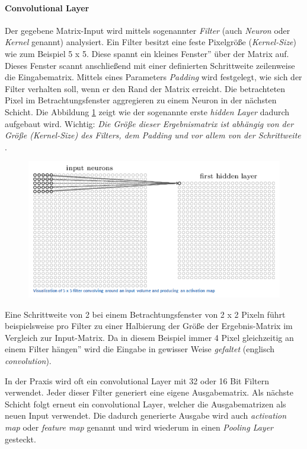 \paragraph{Convolutional Layer}
Der gegebene Matrix-Input wird mittels sogenannter \emph{Filter} (auch \emph{Neuron} oder \emph{Kernel} genannt) analysiert. Ein Filter besitzt eine feste Pixelgröße (\emph{Kernel-Size}) wie zum Beispiel 5 x 5. Diese spannt ein kleines \glqq Fenster'' über der Matrix auf. Dieses Fenster scannt anschließend mit einer definierten Schrittweite zeilenweise die Eingabematrix. Mittels eines Parameters \emph{Padding} wird festgelegt, wie sich der Filter verhalten soll, wenn er den Rand der Matrix erreicht. Die betrachteten Pixel im Betrachtungsfenster aggregieren zu einem Neuron in der nächsten Schicht. Die Abbildung \ref{fig:cnn_convLayer} zeigt wie der sogenannte erste \emph{hidden Layer} dadurch aufgebaut wird. Wichtig: \emph{Die Größe dieser Ergebnismatrix ist abhängig von der Größe (Kernel-Size) des Filters, dem Padding und vor allem von der Schrittweite} \cite{cnnFunktionsweise2}. 

\begin{figure}[!htb]
	\centering
	\includegraphics[width=.6\linewidth]{img/cnn_convLayer}
	\label{fig:cnn_convLayer}
\end{figure}

Eine Schrittweite von 2 bei einem Betrachtungsfenster von 2 x 2 Pixeln führt beispielsweise pro Filter zu einer Halbierung der Größe der Ergebnis-Matrix im Vergleich zur Input-Matrix. Da in diesem Beispiel immer 4 Pixel gleichzeitig an einem Filter \glqq hängen'' wird die Eingabe in gewisser Weise \emph{gefaltet} (englisch \emph{convolution}). 

In der Praxis wird oft ein convolutional Layer mit 32 oder 16 Bit Filtern verwendet. Jeder dieser Filter generiert eine eigene Ausgabematrix. Als nächste Schicht folgt erneut ein convolutional Layer, welcher die Ausgabematrizen als neuen Input verwendet. Die dadurch generierte Ausgabe wird auch \emph{activation map} oder \emph{feature map} genannt und wird wiederum in einen \emph{Pooling Layer} gesteckt. 

